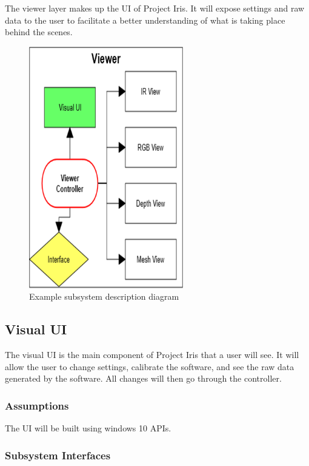 The viewer layer makes up the UI of Project Iris. It will expose settings and raw data to the user to facilitate a better understanding of what is taking place behind the scenes.

\begin{figure}[h!]
	\centering
	\includegraphics[width=0.60\textwidth]{images/viewer}
	\caption{Example subsystem description diagram}
\end{figure}

\subsection{Visual UI}
The visual UI is the main component of Project Iris that a user will see. It will allow the user to change settings, calibrate the software, and see the raw data generated by the software. All changes will then go through the controller.

\subsubsection{Assumptions}
The UI will be built using windows 10 APIs.

\subsubsection{Subsystem Interfaces}

